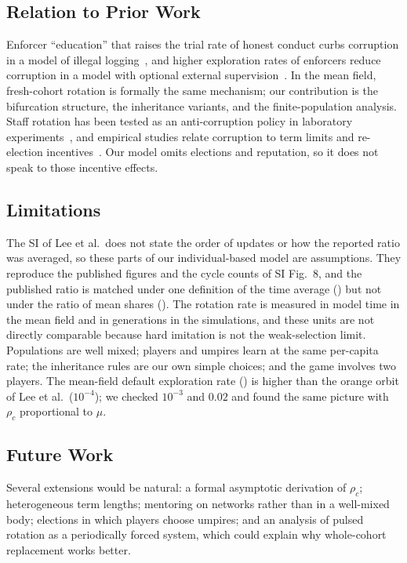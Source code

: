 \documentclass[journal]{IEEEtran}
\newcommand{\rhoc}{\rho_c}
\begin{document}
\subsection{Relation to Prior Work}
Enforcer ``education'' that raises the trial rate of honest conduct curbs corruption in a model of
illegal logging~\cite{lee2015logging}, and higher exploration rates of enforcers reduce corruption
in a model with optional external supervision~\cite{zhou2023supervision}. In the mean field,
fresh-cohort rotation is formally the same mechanism; our contribution is the bifurcation
structure, the inheritance variants, and the finite-population analysis. Staff rotation has been
tested as an anti-corruption policy in laboratory
experiments~\cite{abbink2004rotation,buhren2020rotation}, and empirical studies relate corruption
to term limits and re-election incentives~\cite{ferraz2011electoral,laurent2021horizon}. Our
model omits elections and reputation, so it does not speak to those incentive effects.

\subsection{Limitations}
The SI of Lee et al.\ does not state the order of updates or how the reported
ratio was averaged, so these parts of our individual-based model are assumptions. They reproduce
the published figures and the cycle counts of SI Fig.~8, and the published ratio
\PaperRatio{} is matched under one definition of the time average (\BthreePure) but not under
the ratio of mean shares (\BthreeRatio). The rotation rate is measured in
model time in the mean field and in generations in the simulations, and these units are not
directly comparable because hard imitation is not the weak-selection limit. Populations are well
mixed; players and umpires learn at the same per-capita rate; the inheritance rules are our own
simple choices; and the game involves two players. The mean-field default exploration rate
(\MuMF) is higher than the orange orbit of Lee et al.\ ($10^{-4}$); we checked $10^{-3}$ and
$0.02$ and found the same picture with $\rhoc$ proportional to $\mu$.

\subsection{Future Work}
Several extensions would be natural: a formal asymptotic derivation of $\rhoc$; heterogeneous
term lengths; mentoring on networks rather than in a well-mixed body; elections in which players
choose umpires; and an analysis of pulsed rotation as a periodically forced system, which could
explain why whole-cohort replacement works better.
\end{document}
